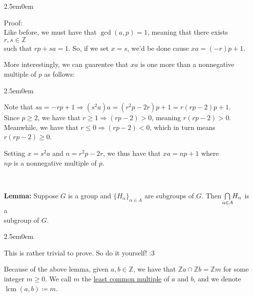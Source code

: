 \documentclass{book}
\newcommand{\hOne}{%
   \color{Black}%
   \fontsize{14}{16}\selectfont%
}
\newcommand{\hTwo}{%
\color{MidnightBlue}%
   \fontsize{13}{15}\selectfont%
}
\newcommand{\hThree}{%
   \color{PineGreen!85!Orange}
   \fontsize{12}{14}\selectfont%
}
\newcommand{\exTwoP}{%
   \color{RedViolet}%
   \fontsize{13}{15}\selectfont%
}
\newenvironment{myIndent}{%
   \begin{adjustwidth}{2.5em}{0em}%
}{%
   \end{adjustwidth}%
}
\newcommand{\udefine}[1]{{%
   \setulcolor{Red}%
   \setul{0.14em}{0.07em}%
   \ul{#1}%
}}
\newcommand{\blab}[1]{\textbf{#1}}
\DeclareMathOperator{\lcm}{lcm}
\newcommand{\mySepTwo}[1][.]{%
   {\noindent\color{#1}{\rule{6.5in}{0.5mm}}}\\%
}
\newcommand{\retTwo}{\hfill\bigbreak}
\begin{document}
\begin{myIndent}\exTwoP
	Proof:\\
	Like before, we must have that $\gcd(a, p) = 1$, meaning that there exists $r, s \in \mathbb{Z}$\\ such that $rp + sa = 1$. So, if we set $x = s$, we'd be done cause $xa = (-r)p + 1$.\retTwo

	More interestingly, we can guarentee that $xa$ is one more than a nonnegative multiple of $p$ as follows:\newpage
	\begin{myIndent}
		Note that $sa = -rp + 1 \Longrightarrow (s^2a)a = (r^2p - 2r)p + 1 = r(rp - 2)p + 1$.\\ Since $p \geq 2$, we have that $r \geq 1 \Longrightarrow (rp - 2) > 0$, meaning $r(rp - 2) > 0$.\\ Meanwhile, we have that $r \leq 0 \Longrightarrow (rp - 2) < 0$, which in turn means $r(rp - 2) \geq 0$.\retTwo

		Setting $x = s^2a$ and $n = r^2p - 2r$, we thus have that $xa = np + 1$ where\\ $np$ is a nonnegative multiple of $p$.
	\end{myIndent}
\end{myIndent}

\mySepTwo

\hTwo
\blab{Lemma:} Suppose $G$ is a group and $\{H_\alpha\}_{\alpha \in A}$ are subgroups of $G$. Then $\hspace{-0.3em}\bigcap\limits_{\alpha \in A}\hspace{-0.3em}H_\alpha$ is a\\ [-10pt] subgroup of $G$.
\begin{myIndent}\hThree
	This is rather trivial to prove. So do it yourself! :3\retTwo
\end{myIndent}

\hOne

Because of the above lemma, given $a, b \in \mathbb{Z}$, we have that $\mathbb{Z}a \cap \mathbb{Z}b = \mathbb{Z}m$ for some integer $m \geq 0$. We call $m$ the \udefine{least common multiple} of $a$ and $b$, and we denote $\lcm(a, b) \coloneq m$.
\end{document}
